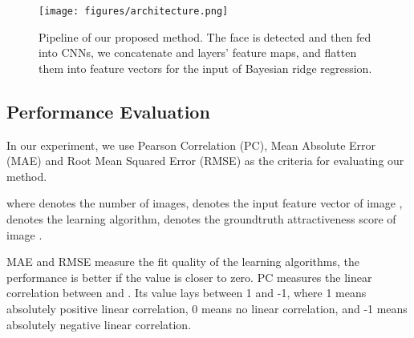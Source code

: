 \documentclass[a4paper,conference]{IEEEtran}
\begin{document}
    \begin{figure}[htb]
      \centering
      \texttt{[image: figures/architecture.png]}
      \caption{Pipeline of our proposed method. The face is detected and
        then fed into CNNs, we concatenate  and  layers'
        feature maps, and flatten them into feature vectors for the input of Bayesian
        ridge regression.}
      \label{pipeline}
    \end{figure}


  \subsection{Performance Evaluation}
    In our experiment, we use Pearson Correlation (PC),
    Mean Absolute Error (MAE) and Root Mean Squared Error (RMSE) as
    the criteria for evaluating our method.

    

    

    
    where  denotes the number of images,  denotes the
    input feature vector of image ,  denotes the learning algorithm,
     denotes the groundtruth attractiveness score of image .

    MAE and RMSE measure the fit quality of the learning algorithms,
    the performance is better if the value is closer to zero.
    PC measures the linear correlation between  and .
    Its value lays between 1 and -1, where 1 means absolutely positive linear
    correlation, 0 means no linear correlation, and -1 means absolutely negative
    linear correlation.
\end{document}
